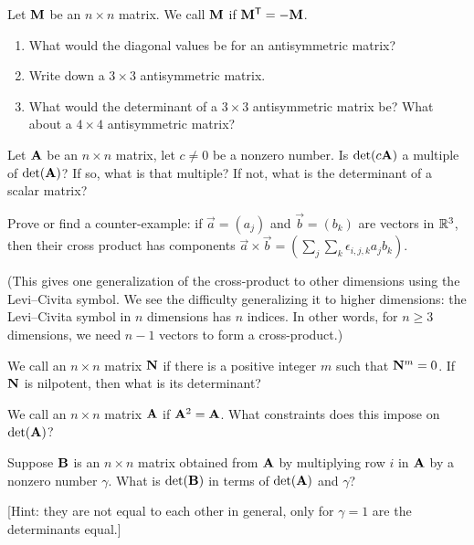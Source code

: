 \begin{exercise}
Let $\mathbf{M}$ be an $n\times n$ matrix.
We call $\mathbf{M}$  if $\mathbf{M}^{\mathsf{T}}=-\mathbf{M}$.
\begin{enumerate}
\item What would the diagonal values be for an antisymmetric matrix?
\item Write down a $3\times 3$ antisymmetric matrix.
\item What would the determinant of a $3\times3$ antisymmetric matrix
  be? What about a $4\times 4$ antisymmetric matrix?
\end{enumerate}
\end{exercise}

\begin{exercise}
Let $\mathbf{A}$ be an $n\times n$ matrix, let $c\neq 0$ be a nonzero number.
Is $\det(c\mathbf{A})$ a multiple of $\det(\mathbf{A})$? If so, what is that multiple?
If not, what is the determinant of a scalar matrix?
\end{exercise}

\begin{exercise}
Prove or find a counter-example: if $\vec{a}=(a_{j})$ and
$\vec{b}=(b_{k})$ are vectors in $\mathbb{R}^{3}$, then their cross product has
components $\vec{a}\times\vec{b} = (\sum_{j}\sum_{k}\epsilon_{i,j,k}a_{j}b_{k})$.
\end{exercise}

(This gives one generalization of the cross-product to other dimensions
using the Levi--Civita symbol. We see the difficulty generalizing it to
higher dimensions: the Levi--Civita symbol in $n$ dimensions has $n$
indices. In other words, for $n\geq3$ dimensions, we need $n-1$ vectors
to form a cross-product.)

\begin{exercise}
We call an $n\times n$ matrix $\mathbf{N}$  if there is a
positive integer $m$ such that $\mathbf{N}^{m}=0$. If $\mathbf{N}$ is
nilpotent, then what is its determinant?
\end{exercise}

\begin{exercise}
We call an $n\times n$ matrix $\mathbf{A}$  if
$\mathbf{A}^{2}=\mathbf{A}$. What constraints does this impose on $\det(\mathbf{A})$?
\end{exercise}

\begin{exercise}
Suppose $\mathbf{B}$ is an $n\times n$ matrix obtained from $\mathbf{A}$ by
multiplying row $i$ in $\mathbf{A}$ by a nonzero number $\gamma$. What is
$\det(\mathbf{B})$ in terms of $\det(\mathbf{A})$ and $\gamma$?

[Hint: they are not equal to each other in general, only for $\gamma=1$
  are the determinants equal.]
\end{exercise}

